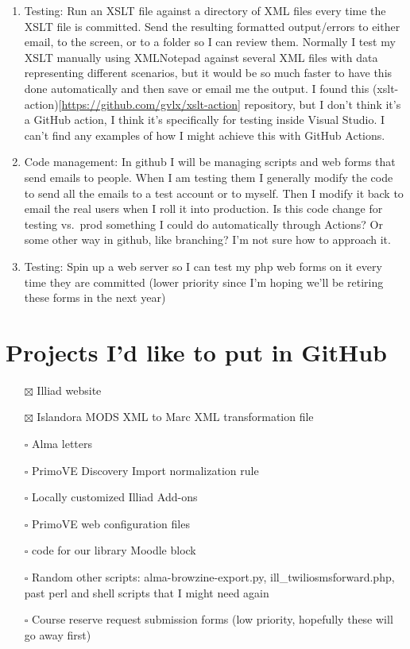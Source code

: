 \documentclass[
  openany]{book}
\providecommand{\tightlist}{%
  \setlength{\itemsep}{0pt}\setlength{\parskip}{0pt}}
\begin{document}
\begin{enumerate}
\def\labelenumi{\arabic{enumi}.}
\setcounter{enumi}{1}
\item
  Testing: Run an XSLT file against a directory of XML files every time the XSLT file is committed. Send the resulting formatted output/errors to either email, to the screen, or to a folder so I can review them.
  Normally I test my XSLT manually using XMLNotepad against several XML files with data representing different scenarios, but it would be so much faster to have this done automatically and then save or email me the output.
  I found this (xslt-action){[}\url{https://github.com/gvlx/xslt-action}{]} repository, but I don't think it's a GitHub action, I think it's specifically for testing inside Visual Studio.
  I can't find any examples of how I might achieve this with GitHub Actions.
\item
  Code management: In github I will be managing scripts and web forms that send emails to people. When I am testing them I generally modify the code to send all the emails to a test account or to myself. Then I modify it back to email the real users when I roll it into production. Is this code change for testing vs.~prod something I could do automatically through Actions? Or some other way in github, like branching? I'm not sure how to approach it.
\item
  Testing: Spin up a web server so I can test my php web forms on it every time they are committed (lower priority since I'm hoping we'll be retiring these forms in the next year)
\end{enumerate}

\hypertarget{projects-id-like-to-put-in-github}{%
\chapter{Projects I'd like to put in GitHub}\label{projects-id-like-to-put-in-github}}

\begin{itemize}
\tightlist
\item[$\boxtimes$]
  Illiad website
\item[$\boxtimes$]
  Islandora MODS XML to Marc XML transformation file
\item[$\square$]
  Alma letters
\item[$\square$]
  PrimoVE Discovery Import normalization rule
\item[$\square$]
  Locally customized Illiad Add-ons
\item[$\square$]
  PrimoVE web configuration files
\item[$\square$]
  code for our library Moodle block
\item[$\square$]
  Random other scripts: alma-browzine-export.py, ill\_twiliosmsforward.php, past perl and shell scripts that I might need again
\item[$\square$]
  Course reserve request submission forms (low priority, hopefully these will go away first)
\end{itemize}
\end{document}
